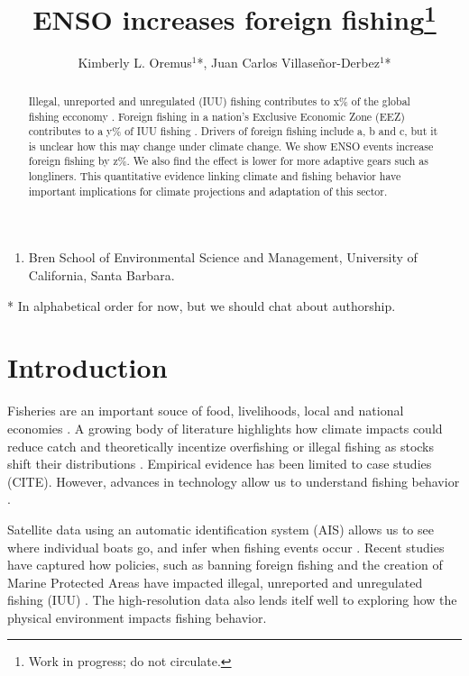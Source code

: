 \documentclass[11pt]{article}
\title{ENSO increases foreign fishing\footnote{Work in progress; do not circulate.}}
\author{ Kimberly L. Oremus$^{1}$*, Juan Carlos Villase\~{n}or-Derbez$^{1}$*}
\begin{document}
\doublespacing
\maketitle

\begin{enumerate}
 \item Bren School of Environmental Science and Management, University of California, Santa Barbara.
\end{enumerate}
* In alphabetical order for now, but we should chat about authorship.

\begin{abstract}
Illegal, unreported and unregulated (IUU) fishing contributes to x\% of the global fishing ecconomy \cite{Agnew:2009}. Foreign fishing in a nation's Exclusive Economic Zone (EEZ) contributes to a y\% of IUU fishing \cite{Cabral:2018}. Drivers of foreign fishing include a, b and c, but it is unclear how this may change under climate change. We show ENSO events increase foreign fishing by z\%. We also find the effect is lower for more adaptive gears such as longliners. This quantitative evidence linking climate and fishing behavior have important implications for climate projections and adaptation of this sector.
\end{abstract}

\newpage

\section{Introduction}

Fisheries are an important souce of food, livelihoods, local and national economies \cite{SOFIA:2018}. A growing body of literature highlights how climate impacts could reduce catch \cite{Sumaila:2011, Lam:2016} and theoretically incentize overfishing or illegal fishing as stocks shift their distributions \cite{Pinsky:2018}. Empirical evidence has been limited to case studies (CITE). However, advances in technology allow us to understand fishing behavior \cite{Kroodsma:2018, Cabral:2018, McDermott:2018}. 

Satellite data using an automatic identification system (AIS) allows us to see where individual boats go, and infer when fishing events occur \cite{ Kroodsma:2018}. Recent studies have captured how policies, such as banning foreign fishing \cite{Cabral:2018} and the creation of Marine Protected Areas have impacted illegal, unreported and unregulated fishing (IUU) \cite{McDermott:2018}. The high-resolution data also lends itelf well to exploring how the physical environment impacts fishing behavior.
\end{document}
